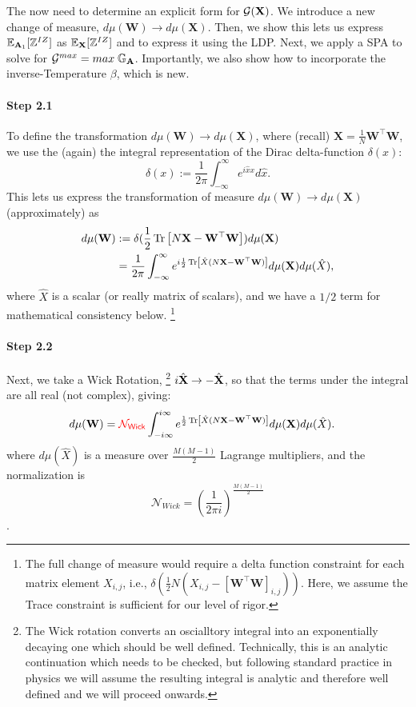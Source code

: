 The now need to  determine an explicit form for
$\mathcal{G}(\mathbf{X})$. We introduce a new change of measure, 
 $d\mu(\mathbf{W})\rightarrow d\mu(\mathbf{X})$.
Then, we show this lets us express $\mathbb{E}_{\mathbf{A}_1}[\mathbb{Z}^{IZ}]$ as $\mathbb{E}_{\mathbf{X}}[\mathbb{Z}^{IZ}]$ and to express it using the LDP.
Next, we apply a SPA to solve for $\mathcal{G}^{max}=max\;\mathbb{G}_{\mathbf{A}}$.
Importantly, we also show how to incorporate the inverse-Temperature $\beta$,
which is new.

\paragraph{Step 2.1}
To define the transformation $d\mu(\mathbf{W})\rightarrow d\mu(\mathbf{X})$,  where (recall) $\mathbf{X}=\frac{1}{N}\mathbf{W}^{\top}\mathbf{W}$,
we use the (again) the integral representation of the Dirac delta-function $\delta(x)$:
\begin{equation}
  \label{eqn:dirac}
  \delta(x):=\frac{1}{2\pi}\int_{-\infty}^{\infty} e^{i\hat{x}x} d\hat{x}.
\end{equation}
%
This lets us express the transformation of measure $d\mu(\mathbf{W})\rightarrow d\mu(\mathbf{X})$
(approximately) as
\begin{align}
\nonumber
  d\mu(\mathbf{W}) &:= \delta(\frac{1}{2}\mbox{}\operatorname{Tr}\left[N\mathbf{X}-\mathbf{W}^{\top}\mathbf{W}\right]) d\mu(\mathbf{X}) \\ 
  &= \frac{1}{2\pi}\int_{-\infty}^{\infty} e^{i\frac{1}{2}
    \mbox{}\operatorname{Tr}\left[\hat{X}(N\mathbf{X}-\mathbf{W}^{\top}\mathbf{W})\right]
  }
  d\mu(\mathbf{X})d\mu(\hat{X} ),
\end{align}
where $\hat{X}$ is a scalar (or really matrix of scalars),
and we have a $1/2$ term for mathematical consistency below.
\footnote{The full change of measure would require a delta function constraint
for each matrix element $X_{i,j}$, i.e., 
$\delta\left(\frac{1}{2}N\left(X_{i,j}-[\mathbf{W}^{\top}\mathbf{W}]_{i,j}\right)\right)$.
Here, we assume the Trace constraint is sufficient for our level of rigor.
}



\paragraph{Step 2.2}
Next, we take a Wick Rotation, 
\footnote{The Wick rotation converts an oscialltory integral into an exponentially decaying one which should be well defined.  Technically, this is an analytic continuation which needs to be checked, but following standard practice in physics we will assume the resulting integral is analytic and therefore well defined and we will proceed onwards. }
$i\hat{\mathbf{X}}\rightarrow -\hat{\mathbf{X}}$, so that the terms under the integral are all real (not complex), giving:
\begin{align}
  \label{eqn:dmuX}
  d\mu(\mathbf{W}) &= {\color{red}\sf{\mathcal{N}_{Wick}}}\int_{-i\infty}^{i\infty} e^{\frac{1}{2}\mbox{}\operatorname{Tr}\left[\hat{X}(N\mathbf{X}-\mathbf{W}^{\top}\mathbf{W})\right]} d\mu(\mathbf{X})d\mu(\hat{X} ).
\end{align}
where $d\mu(\hat{X})$ is a measure over $\tfrac{M(M-1)}{2}$ Lagrange multipliers, and the normalization is  $$\mathcal{N}_{Wick}=(\frac{1}{2\pi i})^{\tfrac{M(M-1)}{2}}$$.

